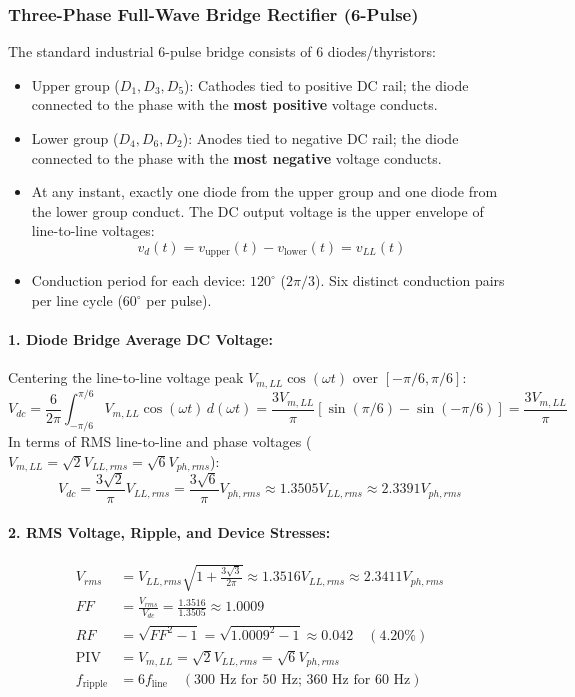 \subsubsection{Three-Phase Full-Wave Bridge Rectifier (6-Pulse)}
The standard industrial 6-pulse bridge consists of 6 diodes/thyristors:
\begin{itemize}
  \item Upper group ($D_1, D_3, D_5$): Cathodes tied to positive DC rail; the diode connected to the phase with the \textbf{most positive} voltage conducts.
  \item Lower group ($D_4, D_6, D_2$): Anodes tied to negative DC rail; the diode connected to the phase with the \textbf{most negative} voltage conducts.
  \item At any instant, exactly one diode from the upper group and one diode from the lower group conduct. The DC output voltage is the upper envelope of line-to-line voltages:
  \begin{equation}
  v_d(t) = v_{\mathrm{upper}}(t) - v_{\mathrm{lower}}(t) = v_{LL}(t)
  \end{equation}
  \item Conduction period for each device: $120^\circ$ ($2\pi/3$). Six distinct conduction pairs per line cycle ($60^\circ$ per pulse).
\end{itemize}

\paragraph{1. Diode Bridge Average DC Voltage:}
Centering the line-to-line voltage peak $V_{m,LL} \cos(\omega t)$ over $[-\pi/6, \pi/6]$:
\begin{equation}
V_{dc} = \frac{6}{2\pi}\int_{-\pi/6}^{\pi/6} V_{m,LL}\cos(\omega t)\,d(\omega t) = \frac{3 V_{m,LL}}{\pi}\left[\sin(\pi/6) - \sin(-\pi/6)\right] = \frac{3 V_{m,LL}}{\pi}
\end{equation}
In terms of RMS line-to-line and phase voltages ($V_{m,LL} = \sqrt{2} V_{LL,rms} = \sqrt{6} V_{ph,rms}$):
\begin{equation}
V_{dc} = \frac{3\sqrt{2}}{\pi} V_{LL,rms} = \frac{3\sqrt{6}}{\pi} V_{ph,rms} \approx 1.3505 V_{LL,rms} \approx 2.3391 V_{ph,rms}
\end{equation}

\paragraph{2. RMS Voltage, Ripple, and Device Stresses:}
\begin{align}
V_{rms} &= V_{LL,rms}\sqrt{1 + \frac{3\sqrt{3}}{2\pi}} \approx 1.3516 V_{LL,rms} \approx 2.3411 V_{ph,rms} \\
FF &= \frac{V_{rms}}{V_{dc}} = \frac{1.3516}{1.3505} \approx 1.0009 \\
RF &= \sqrt{FF^2 - 1} = \sqrt{1.0009^2 - 1} \approx 0.042 \quad (4.20\%) \\
\text{PIV} &= V_{m,LL} = \sqrt{2} V_{LL,rms} = \sqrt{6} V_{ph,rms} \\
f_{\mathrm{ripple}} &= 6 f_{\mathrm{line}} \quad (300\text{ Hz for 50 Hz; } 360\text{ Hz for 60 Hz})
\end{align}
